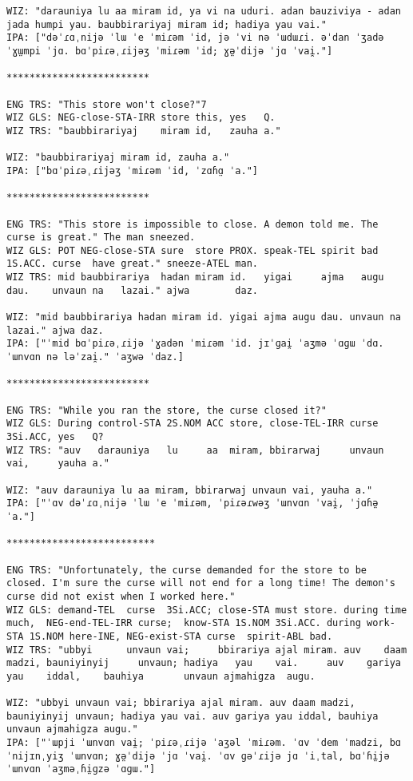 \documentclass[11pt,a4paper]{article}
\begin{document}
\begin{verbatim}
WIZ: "darauniya lu aa miram id, ya vi na uduri. adan bauziviya - adan jada humpi yau. baubbirariyaj miram id; hadiya yau vai."
IPA: ["dəˈɾɑˌnijə ˈlɯ ˈe ˈmiɾəm ˈid, jə ˈvi nə ˈɯdɯɾi. əˈdan ˈʒadə ˈɣɯ̤mpi ˈjɑ. bɑˈpiɾəˌɾijəʒ ˈmiɾəm ˈid; ɣə̤ˈdijə ˈjɑ ˈvai̯."]

*************************

ENG TRS: "This store won't close?"7
WIZ GLS: NEG-close-STA-IRR store this, yes   Q.
WIZ TRS: "baubbirariyaj    miram id,   zauha a."

WIZ: "baubbirariyaj miram id, zauha a."
IPA: ["bɑˈpiɾəˌɾijəʒ ˈmiɾəm ˈid, ˈzɑɦɑ̤ ˈa."]

*************************

ENG TRS: "This store is impossible to close. A demon told me. The curse is great." The man sneezed.
WIZ GLS: POT NEG-close-STA sure  store PROX. speak-TEL spirit bad  1S.ACC. curse  have great." sneeze-ATEL man.
WIZ TRS: mid baubbirariya  hadan miram id.   yigai     ajma   augu dau.    unvaun na   lazai." ajwa        daz.

WIZ: "mid baubbirariya hadan miram id. yigai ajma augu dau. unvaun na lazai." ajwa daz.
IPA: ["ˈmid bɑˈpiɾəˌɾijə ˈɣadən ˈmiɾəm ˈid. jɪˈɡai̯ ˈaʒmə ˈɑɡɯ ˈdɑ. ˈɯnvɑn nə ləˈzai̯." ˈaʒwə ˈdaz.]

*************************

ENG TRS: "While you ran the store, the curse closed it?"
WIZ GLS: During control-STA 2S.NOM ACC store, close-TEL-IRR curse  3Si.ACC, yes   Q?
WIZ TRS: "auv   darauniya   lu     aa  miram, bbirarwaj     unvaun vai,     yauha a."

WIZ: "auv darauniya lu aa miram, bbirarwaj unvaun vai, yauha a."
IPA: ["ˈɑv dəˈɾɑˌnijə ˈlɯ ˈe ˈmiɾəm, ˈpiɾəɾwəʒ ˈɯnvɑn ˈvai̯, ˈjɑɦə̤ ˈa."]

**************************

ENG TRS: "Unfortunately, the curse demanded for the store to be closed. I'm sure the curse will not end for a long time! The demon's curse did not exist when I worked here."
WIZ GLS: demand-TEL  curse  3Si.ACC; close-STA must store. during time much,  NEG-end-TEL-IRR curse;  know-STA 1S.NOM 3Si.ACC. during work-STA 1S.NOM here-INE, NEG-exist-STA curse  spirit-ABL bad.  
WIZ TRS: "ubbyi      unvaun vai;     bbirariya ajal miram. auv    daam madzi, bauniyinyij     unvaun; hadiya   yau    vai.     auv    gariya   yau    iddal,    bauhiya       unvaun ajmahigza  augu.

WIZ: "ubbyi unvaun vai; bbirariya ajal miram. auv daam madzi, bauniyinyij unvaun; hadiya yau vai. auv gariya yau iddal, bauhiya unvaun ajmahigza augu."
IPA: ["ˈɯpji ˈɯnvɑn vai̯; ˈpiɾəˌɾijə ˈaʒəl ˈmiɾəm. ˈɑv ˈdem ˈmadzi, bɑˈnijɪnˌyiʒ ˈɯnvɑn; ɣə̤ˈdijə ˈjɑ ˈvai̯. ˈɑv ɡəˈɾijə jɑ ˈiˌtal, bɑˈɦi̤jə ˈɯnvɑn ˈaʒməˌɦi̤ɡzə ˈɑɡɯ."]

\end{verbatim}
\end{document}
